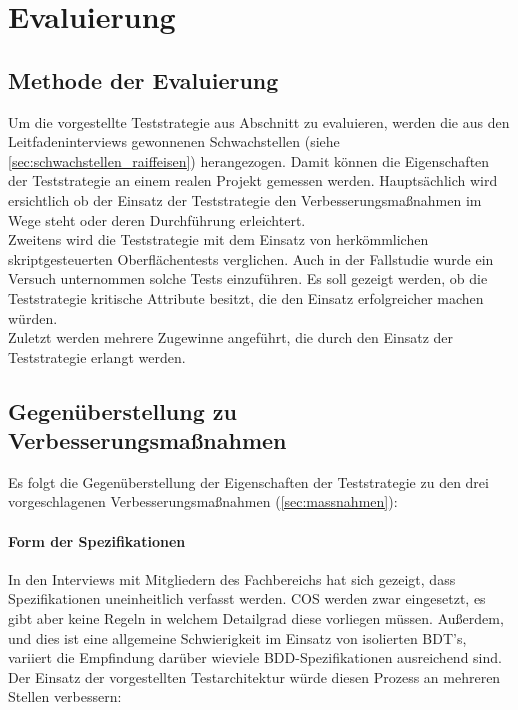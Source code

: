 \chapter{Evaluierung}
\label{sec:mbt_bdt}
\section{Methode der Evaluierung}
Um die vorgestellte Teststrategie aus Abschnitt \label{sec:mbt_bdt_concept} zu evaluieren, werden die aus den Leitfadeninterviews gewonnenen Schwachstellen (siehe \ref{sec:schwachstellen_raiffeisen}) herangezogen. Damit können die Eigenschaften der Teststrategie an einem realen Projekt gemessen werden. Hauptsächlich wird ersichtlich ob der Einsatz der Teststrategie den Verbesserungsmaßnahmen im Wege steht oder deren Durchführung erleichtert.\\
Zweitens wird die Teststrategie mit dem Einsatz von herkömmlichen skriptgesteuerten Oberflächentests verglichen. Auch in der Fallstudie wurde ein Versuch unternommen solche Tests einzuführen. Es soll gezeigt werden, ob die Teststrategie kritische Attribute besitzt, die den Einsatz erfolgreicher machen würden.\\
Zuletzt werden mehrere Zugewinne angeführt, die durch den Einsatz der Teststrategie erlangt werden.

\section{Gegenüberstellung zu Verbesserungsmaßnahmen}
Es folgt die Gegenüberstellung der Eigenschaften der Teststrategie zu den drei vorgeschlagenen Verbesserungsmaßnahmen (\ref{sec:massnahmen}):

\subsubsection{Form der Spezifikationen}
In den Interviews mit Mitgliedern des Fachbereichs hat sich gezeigt, dass Spezifikationen uneinheitlich verfasst werden. \Gls{COS} werden zwar eingesetzt, es gibt aber keine Regeln in welchem Detailgrad diese vorliegen müssen. Außerdem, und dies ist eine allgemeine Schwierigkeit im Einsatz von isolierten \Gls{BDT}'s, variiert die Empfindung darüber wieviele \Gls{BDD}-Spezifikationen ausreichend sind.\\ Der Einsatz der vorgestellten Testarchitektur würde diesen Prozess an mehreren Stellen verbessern:

